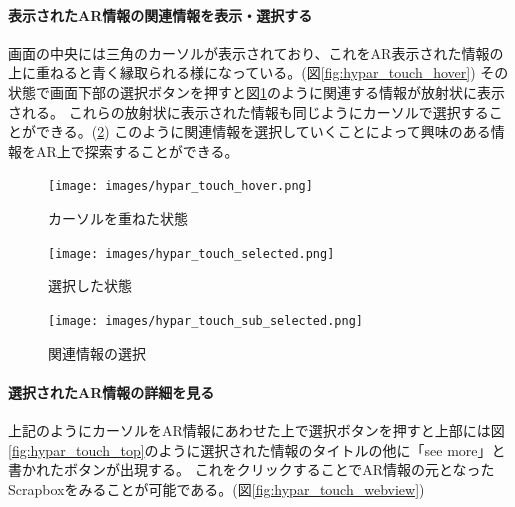 \paragraph*{表示されたAR情報の関連情報を表示・選択する}
画面の中央には三角のカーソルが表示されており、これをAR表示された情報の上に重ねると青く縁取られる様になっている。(図\ref{fig:hypar_touch_hover})
その状態で画面下部の選択ボタンを押すと図\ref{fig:hypar_touch_selected}のように関連する情報が放射状に表示される。
これらの放射状に表示された情報も同じようにカーソルで選択することができる。(\ref{fig:hypar_touch_sub_selected})
このように関連情報を選択していくことによって興味のある情報をAR上で探索することができる。

\begin{figure}[h]
  \begin{minipage}{0.5\hsize}
    \centering
    \texttt{[image: images/hypar\_touch\_hover.png]}
    \caption{カーソルを重ねた状態} \label{fig:hypar_touch_hover}
  \end{minipage}
  \begin{minipage}{0.5\hsize}
    \centering
    \texttt{[image: images/hypar\_touch\_selected.png]}
    \caption{選択した状態} \label{fig:hypar_touch_selected}
  \end{minipage}
\end{figure}

\begin{figure}[h]
    \centering
    \texttt{[image: images/hypar\_touch\_sub\_selected.png]}
    \caption{関連情報の選択} \label{fig:hypar_touch_sub_selected}
\end{figure}

\paragraph*{選択されたAR情報の詳細を見る}
上記のようにカーソルをAR情報にあわせた上で選択ボタンを押すと上部には図\ref{fig:hypar_touch_top}のように選択された情報のタイトルの他に「see more」と書かれたボタンが出現する。
これをクリックすることでAR情報の元となったScrapboxをみることが可能である。(図\ref{fig:hypar_touch_webview})

